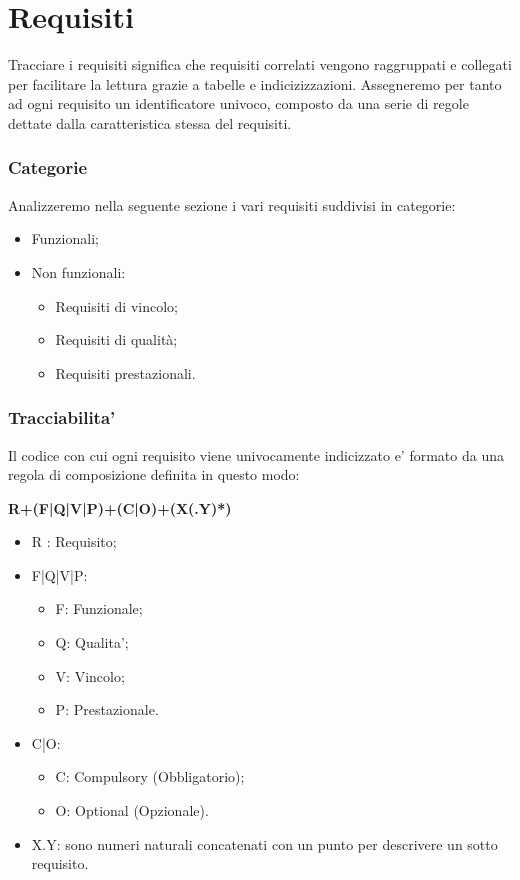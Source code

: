 
\section{Requisiti}
    Tracciare i requisiti \pedice significa che requisiti correlati vengono raggruppati e collegati per facilitare la lettura grazie a tabelle e indicizizzazioni.
    Assegneremo per tanto ad ogni requisito un identificatore univoco, composto da una serie di regole dettate dalla caratteristica stessa del requisiti.
    
    \subsubsection{Categorie}
    Analizzeremo nella seguente sezione i vari requisiti suddivisi in categorie:
    \begin{itemize}
        \item Funzionali;
        \item Non funzionali:
            \begin{itemize}
                \item Requisiti di vincolo;
                \item Requisiti di qualità;
                \item Requisiti prestazionali.
            \end{itemize}
    \end{itemize}
    
    \subsubsection{Tracciabilita'}
    Il codice con cui ogni requisito viene univocamente indicizzato e' formato da una regola di composizione definita in questo modo:
    \newline
    
    \begin{center}
        \textbf{R+(F|Q|V|P)+(C|O)+(X(.Y)*)}    
    \end{center}
    
    
    \begin{itemize}
        \item R : Requisito;
        \item F|Q|V|P:
            \begin{itemize}
                \item F: Funzionale;
                \item Q: Qualita';
                \item V: Vincolo;
                \item P: Prestazionale.
            \end{itemize}
        \item C|O:
            \begin{itemize}
                \item C: Compulsory (Obbligatorio);
                \item O: Optional (Opzionale).
            \end{itemize}
        \item X.Y: sono numeri naturali concatenati con un punto per descrivere un sotto requisito.
    \end{itemize}
    
